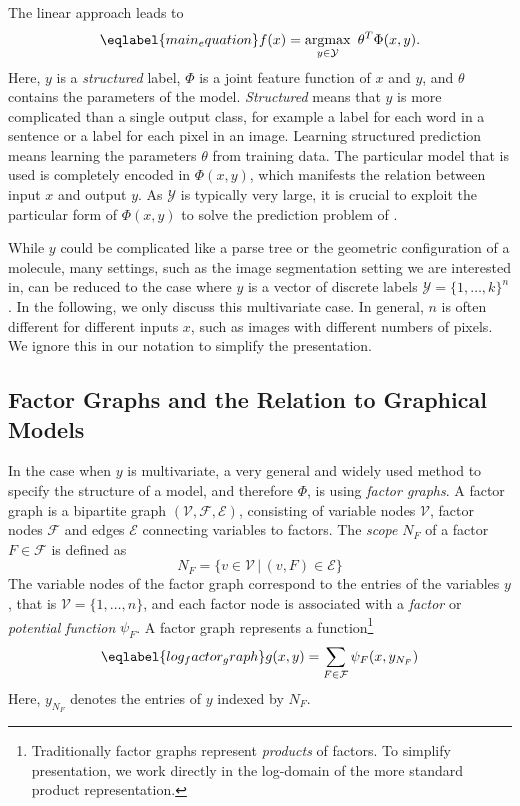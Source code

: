 The linear approach leads to
\begin{equation}\eqlabel{main_equation}
    f(x) = \argmax_{y \in \mathcal{Y}}\  \theta^T \Phi(x, y).
\end{equation}
Here, $y$ is a \emph{structured} label, $\Phi$ is a joint feature function of
$x$ and $y$, and $\theta$ contains the parameters of the model. \emph{Structured} means
that $y$ is more complicated than a single output class, for example a label
for each word in a sentence or a label for each pixel in an image.
Learning structured prediction means learning the parameters $\theta$ from
training data.  The particular model that is used is completely encoded in
$\Phi(x, y)$, which manifests the relation between input $x$ and output $y$. As
$\mathcal{Y}$ is typically very large, it is crucial to exploit the particular
form of $\Phi(x, y)$ to solve the prediction problem of .

While $y$ could be complicated like a parse tree or the geometric
configuration of a molecule, many settings, such as the image segmentation
setting we are interested in, can be reduced to the case where $y$ is a vector of
discrete labels $\mathcal{Y} = \{1, \dotsc, k\}^n$.
In the following, we only discuss this multivariate case. In general, $n$
is often different for different inputs $x$, such as images with different
numbers of pixels.  We ignore this in our notation to simplify the
presentation.

\subsection{Factor Graphs and the Relation to Graphical Models}
In the case when $y$ is multivariate, a very general and widely used method to
specify the structure of a model, and therefore $\Phi$, is using \emph{factor
graphs}. A factor graph is a bipartite graph $(\mathcal{V}, \mathcal{F},
\mathcal{E})$, consisting of variable nodes $\mathcal{V}$, factor nodes
$\mathcal{F}$ and edges $\mathcal{E}$ connecting variables to factors. The
\emph{scope} $N_F$ of a factor $F \in \mathcal{F}$ is defined as
\begin{equation}
    N_F = \{ v \in \mathcal{V} \,|\, (v,F) \in \mathcal{E} \}
\end{equation}
The variable nodes of the factor graph correspond to the entries of the
variables $y$, that is $\mathcal{V} = \{1, \dotsc, n\}$, and each factor node
is associated with a \emph{factor} or \emph{potential function} $\psi_F$.
A factor graph represents a function\footnote{Traditionally factor graphs
 represent \emph{products} of factors.  To simplify presentation, we work
directly in the log-domain of the more standard product representation.}
\begin{equation}\eqlabel{log_factor_graph}
    g(x, y) = \sum_{F \in \mathcal{F}} \psi_F(x, y_{N_F})
\end{equation}
Here, $y_{N_F}$ denotes the entries of $y$ indexed by $N_F$.

